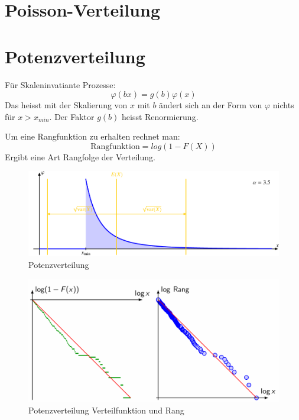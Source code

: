 \documentclass[../Main.tex]{subfiles}
\begin{document}
\section{Poisson-Verteilung}
\section{Potenzverteilung}
Für Skaleninvatiante Prozesse:
\begin{equation}
    \varphi(bx) = g(b)\varphi(x)
\end{equation}
Das heisst mit der Skalierung von \(x\) mit \(b\) ändert sich
an der Form von \(\varphi\) nichts für \(x > x_{min}\).
Der Faktor \(g(b)\) heisst Renormierung.


Um eine Rangfunktion zu erhalten rechnet man:
\begin{equation}
    \text{Rangfunktion} = log(1-F(X))
\end{equation}
Ergibt eine Art Rangfolge der Verteilung.

\begin{figure}[H]
    \centering
    \includegraphics[width=1\linewidth]{Images/potenzverteilung.png}
    \caption{Potenzverteilung}
\end{figure}

\begin{figure}[H]
    \centering
    \includegraphics[width=0.75\linewidth]{Images/potenz-verteilfunktion-rang.png}
    \caption{Potenzverteilung Verteilfunktion und Rang}
\end{figure}
\end{document}
